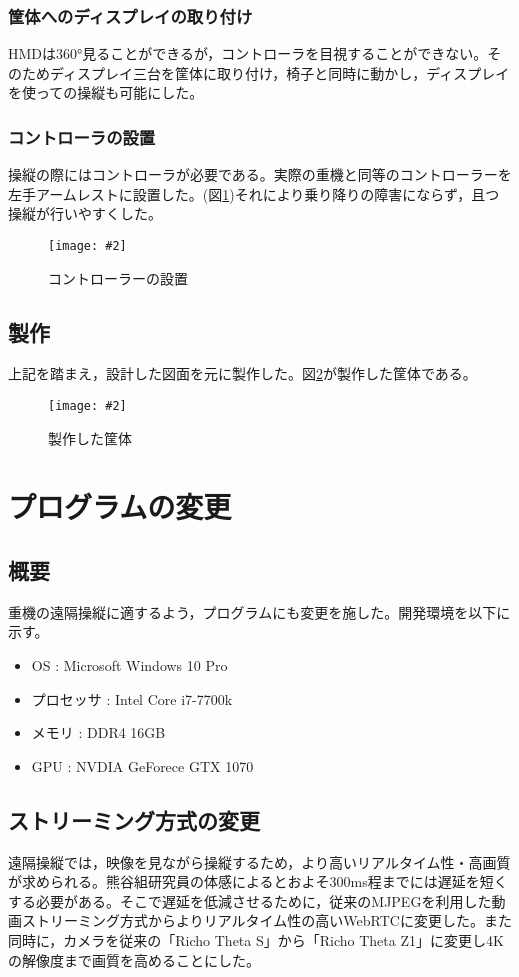 \documentclass[a4paper,12pt]{jsarticle}
\newcommand{\figuref}[1]{図\ref{#1}}
\newcommand{\fig}[4][width=\textwidth]{
    \begin{figure}[!h]
    \begin{center}
    \texttt{[image: \#2]}
    \caption{#3}
    \label{#4}
    \vspace*{-1cm}
    \end{center}
    \end{figure}
}
\begin{document}
\subsubsection{筐体へのディスプレイの取り付け}
HMDは360°見ることができるが，コントローラを目視することができない。そのためディスプレイ三台を筐体に取り付け，椅子と同時に動かし，ディスプレイを使っての操縦も可能にした。

\subsubsection{コントローラの設置}
操縦の際にはコントローラが必要である。実際の重機と同等のコントローラーを左手アームレストに設置した。(\figuref{controller})それにより乗り降りの障害にならず，且つ操縦が行いやすくした。
\fig[width=9cm]{image/controller.png}{コントローラーの設置}{controller}

\subsection{製作}
上記を踏まえ，設計した図面を元に製作した。\figuref{body}が製作した筐体である。
\fig[width=9cm]{image/body.jpg}{製作した筐体}{body}

\clearpage

\section{プログラムの変更}
\subsection{概要}
重機の遠隔操縦に適するよう，プログラムにも変更を施した。開発環境を以下に示す。
\begin{itemize}
    \item OS : Microsoft Windows 10 Pro
    \item プロセッサ : Intel Core i7-7700k
    \item メモリ : DDR4 16GB
    \item GPU : NVDIA GeForece GTX 1070
\end{itemize}

\subsection{ストリーミング方式の変更}
遠隔操縦では，映像を見ながら操縦するため，より高いリアルタイム性・高画質が求められる。熊谷組研究員の体感によるとおよそ300ms程までには遅延を短くする必要がある。そこで遅延を低減させるために，従来のMJPEGを利用した動画ストリーミング方式からよりリアルタイム性の高いWebRTCに変更した。また同時に，カメラを従来の「Richo Theta S」から「Richo Theta Z1」に変更し4Kの解像度まで画質を高めることにした。
\end{document}

